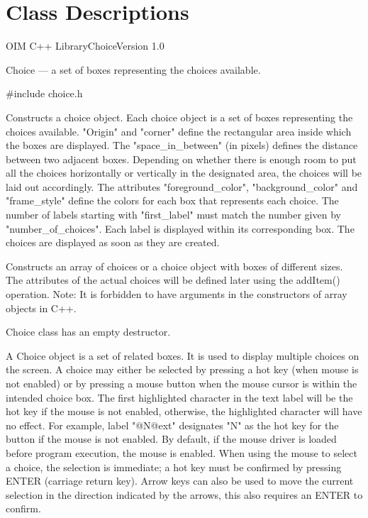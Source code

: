 \newpage

\raggedbottom
{}
\pagestyle{headings}
\chapter*{Class Descriptions}

\begin{manpage}{OIM C++ Library}{Choice}{Version 1.0}

\subtitle{Name}
    Choice --- a set of boxes representing the choices available. 

\subtitle{Declaration}
    \#include \<choice.h\>

    Constructs a choice object.  Each choice object is a set of boxes
    representing the choices available.  "Origin" and "corner" define the
    rectangular area inside which the boxes are displayed. 
    The "space_in_between" (in pixels)
    defines the distance between two adjacent boxes.  Depending on 
    whether there is enough room to put all the choices horizontally
    or vertically in the designated area,
    the choices will be laid out accordingly.  The
    attributes "foreground_color", "background_color" and "frame_style"
    define the colors for each box that represents each choice.
    The number of labels starting with "first_label" must match the
    number given by "number_of_choices".  Each label is displayed within
    its corresponding box.  The choices are displayed 
    as soon as they are created.

    Constructs an array of choices or 
    a choice object with boxes of different sizes.  The attributes
    of the actual choices will be defined later using the
    addItem() operation. Note: It is forbidden to have arguments
    in the constructors of array objects in C++. 

    Choice class has an empty destructor.

\subtitle{Description}
    A Choice object is a set of related boxes. It is used to display
    multiple choices on the screen. 
    A choice may either be selected by pressing a hot key
    (when mouse is not enabled) or by pressing a mouse button when the mouse
    cursor is within the intended choice box.  
    The first highlighted character in the text label will be the 
    hot key if the mouse is not enabled, otherwise, the highlighted
    character will have no effect. For example, label "@N@ext" designates
    "N" as the hot key for the button if the mouse is not enabled.
    By default, if the mouse driver is loaded before program execution,
    the mouse is enabled.  When using the mouse to select
    a choice, the selection is immediate; a hot key must be confirmed
    by pressing ENTER (carriage return key).  Arrow keys can also be used
    to move the current selection in the direction indicated by the arrows,
    this also requires an ENTER to confirm.


\end{manpage}
